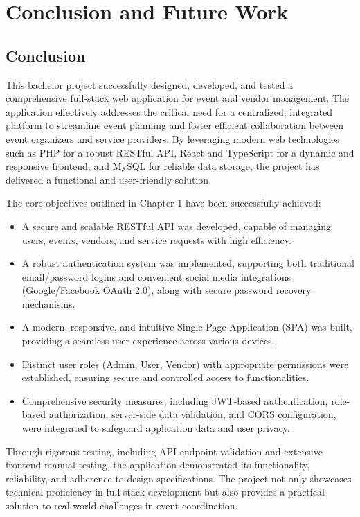 \documentclass{report}
\begin{document}
\chapter{Conclusion and Future Work}
\label{chap:conclusion_future_work}

\section{Conclusion}
\label{sec:conclusion}
This bachelor project successfully designed, developed, and tested a comprehensive full-stack web application for event and vendor management. The application effectively addresses the critical need for a centralized, integrated platform to streamline event planning and foster efficient collaboration between event organizers and service providers. By leveraging modern web technologies such as PHP for a robust RESTful API, React and TypeScript for a dynamic and responsive frontend, and MySQL for reliable data storage, the project has delivered a functional and user-friendly solution.

The core objectives outlined in Chapter 1 have been successfully achieved:
\begin{itemize}
    \item A secure and scalable RESTful API was developed, capable of managing users, events, vendors, and service requests with high efficiency.
    \item A robust authentication system was implemented, supporting both traditional email/password logins and convenient social media integrations (Google/Facebook OAuth 2.0), along with secure password recovery mechanisms.
    \item A modern, responsive, and intuitive Single-Page Application (SPA) was built, providing a seamless user experience across various devices.
    \item Distinct user roles (Admin, User, Vendor) with appropriate permissions were established, ensuring secure and controlled access to functionalities.
    \item Comprehensive security measures, including JWT-based authentication, role-based authorization, server-side data validation, and CORS configuration, were integrated to safeguard application data and user privacy.
\end{itemize}
Through rigorous testing, including API endpoint validation and extensive frontend manual testing, the application demonstrated its functionality, reliability, and adherence to design specifications. The project not only showcases technical proficiency in full-stack development but also provides a practical solution to real-world challenges in event coordination.
\end{document}
